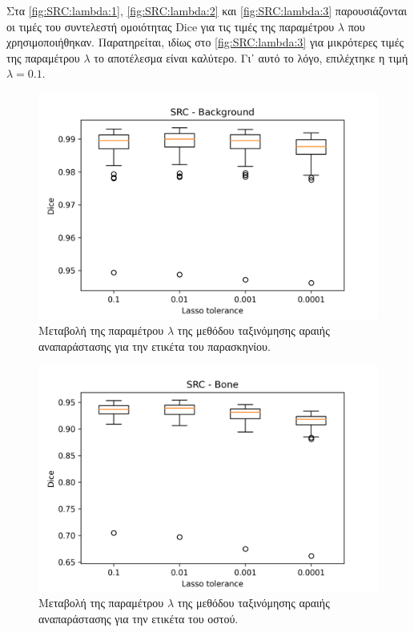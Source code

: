 \documentclass[a4paper,12pt]{article}
\begin{document}
Στα \autoref{fig:SRC:lambda:1}, \autoref{fig:SRC:lambda:2} και
\autoref{fig:SRC:lambda:3} παρουσιάζονται οι τιμές του συντελεστή ομοιότητας
Dice για τις τιμές της παραμέτρου $\lambda$ που χρησιμοποιήθηκαν. Παρατηρείται,
ιδίως στο \autoref{fig:SRC:lambda:3} για μικρότερες τιμές της παραμέτρου
$\lambda$ το αποτέλεσμα είναι καλύτερο. Γι᾽ αυτό το λόγο, επιλέχτηκε η τιμή
$\lambda = 0.1$.

\begin{figure}[H]
    \centering
    \includegraphics[width=0.85\linewidth]{SRC_Lasso_tolerance_Background_plot.png}
    \caption{Μεταβολή της παραμέτρου $\lambda$ της μεθόδου ταξινόμησης αραιής
             αναπαράστασης για την ετικέτα του παρασκηνίου.}
    \label{fig:SRC:lambda:1}
\end{figure}

\begin{figure}[H]
    \centering
    \includegraphics[width=0.85\linewidth]{SRC_Lasso_tolerance_Bone_plot.png}
    \caption{Μεταβολή της παραμέτρου $\lambda$ της μεθόδου ταξινόμησης αραιής
             αναπαράστασης για την ετικέτα του οστού.}
    \label{fig:SRC:lambda:2}
\end{figure}
\end{document}
